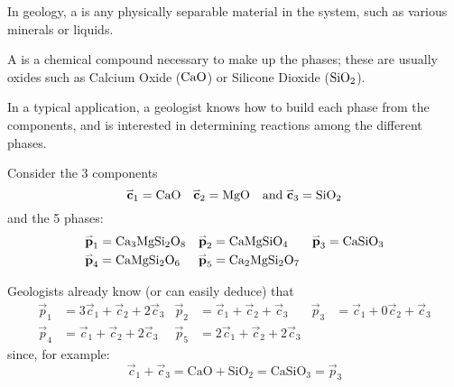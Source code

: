 

\begin{definition}
In geology, a  is any physically separable material in the system, such as various minerals or liquids.

\vspace{1em}

A  is a chemical compound necessary to make up the phases; these are usually oxides such as Calcium Oxide (${\rm CaO}$) or Silicone Dioxide (${\rm SiO_2}$).

\vspace{1em}

In a typical application, a geologist knows how to build each phase from the components, and is interested in determining reactions among the different phases.
\end{definition}

\begin{observation}
Consider the 3 components 
\[\vec{c}_1={\rm CaO} \hspace{1em} \vec{c}_2={\rm MgO} \hspace{1em} \text{and } \vec{c}_3={\rm SiO_2}\]
and the 5 phases:
\begin{align*}
\vec{p}_1 &= {\rm Ca_3MgSi_2O_8} & \vec{p}_2 &= {\rm CaMgSiO_4} & \vec{p}_3 &= {\rm CaSiO_3} \\
\vec{p}_4 &= {\rm CaMgSi_2O_6} & \vec{p}_5 &= {\rm Ca_2MgSi_2O_7}
\end{align*}

Geologists already know (or can easily deduce) that
\begin{align*}
\vec{p}_1 &= 3\vec{c}_1 + \vec{c}_2 + 2 \vec{c}_3 & \vec{p}_2 &= \vec{c}_1 +\vec{c}_2 + \vec{c}_3  &
\vec{p}_3 &= \vec{c}_1 + 0\vec{c}_2 +  \vec{c}_3 \\
\vec{p}_4 &= \vec{c}_1 +\vec{c}_2 + 2\vec{c}_3 &  \vec{p}_5 &= 2\vec{c}_1 + \vec{c}_2 + 2 \vec{c}_3 
\end{align*}
since, for example:
\[
\vec c_1+\vec c_3 = \mathrm{CaO} + \mathrm{SiO_2} = \mathrm{CaSiO_3} = \vec p_3  
\]
\end{observation}

